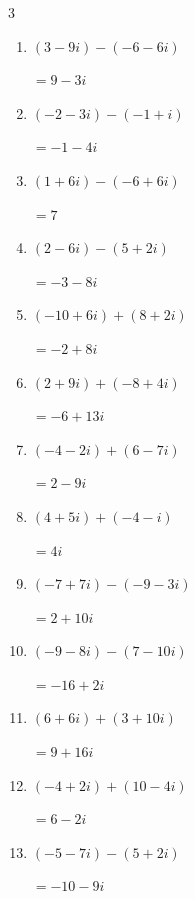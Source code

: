 \begin{multicols}{3}
\begin{enumerate}
        $\displaystyle =5+10i$

  \item $\displaystyle (3-9i) - (-6-6i)$

        $\displaystyle =9-3i$

\columnbreak %

  \item $\displaystyle (-2-3i) - (-1+i)$

        $\displaystyle =-1-4i$

  \item $\displaystyle (1+6i) - (-6+6i)$

        $\displaystyle =7$

  \item $\displaystyle (2-6i) - (5+2i)$

        $\displaystyle =-3-8i$

  \item $\displaystyle (-10+6i) + (8+2i)$

        $\displaystyle =-2+8i$

  \item $\displaystyle (2+9i) + (-8+4i)$

        $\displaystyle =-6+13i$

  \item $\displaystyle (-4-2i) + (6-7i)$

        $\displaystyle =2-9i$

  \item $\displaystyle (4+5i) + (-4-i)$

        $\displaystyle =4i$

  \item $\displaystyle (-7+7i) - (-9-3i)$

        $\displaystyle =2+10i$

  \item $\displaystyle (-9-8i) - (7-10i)$

        $\displaystyle =-16+2i$

  \item $\displaystyle (6+6i) + (3+10i)$

        $\displaystyle =9+16i$

  \item $\displaystyle (-4+2i) + (10-4i)$

        $\displaystyle =6-2i$

  \item $\displaystyle (-5-7i) - (5+2i)$

        $\displaystyle =-10-9i$


\end{enumerate}
\end{multicols}
